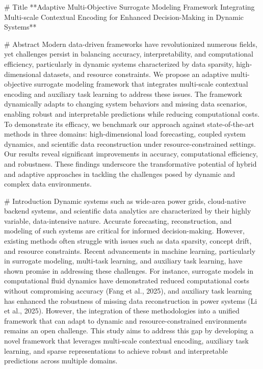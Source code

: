 # Title  
**Adaptive Multi-Objective Surrogate Modeling Framework Integrating Multi-scale Contextual Encoding for Enhanced Decision-Making in Dynamic Systems**

# Abstract  
Modern data-driven frameworks have revolutionized numerous fields, yet challenges persist in balancing accuracy, interpretability, and computational efficiency, particularly in dynamic systems characterized by data sparsity, high-dimensional datasets, and resource constraints. We propose an adaptive multi-objective surrogate modeling framework that integrates multi-scale contextual encoding and auxiliary task learning to address these issues. The framework dynamically adapts to changing system behaviors and missing data scenarios, enabling robust and interpretable predictions while reducing computational costs. To demonstrate its efficacy, we benchmark our approach against state-of-the-art methods in three domains: high-dimensional load forecasting, coupled system dynamics, and scientific data reconstruction under resource-constrained settings. Our results reveal significant improvements in accuracy, computational efficiency, and robustness. These findings underscore the transformative potential of hybrid and adaptive approaches in tackling the challenges posed by dynamic and complex data environments.

# Introduction  
Dynamic systems such as wide-area power grids, cloud-native backend systems, and scientific data analytics are characterized by their highly variable, data-intensive nature. Accurate forecasting, reconstruction, and modeling of such systems are critical for informed decision-making. However, existing methods often struggle with issues such as data sparsity, concept drift, and resource constraints. Recent advancements in machine learning, particularly in surrogate modeling, multi-task learning, and auxiliary task learning, have shown promise in addressing these challenges. For instance, surrogate models in computational fluid dynamics have demonstrated reduced computational costs without compromising accuracy (Fang et al., 2025), and auxiliary task learning has enhanced the robustness of missing data reconstruction in power systems (Li et al., 2025). However, the integration of these methodologies into a unified framework that can adapt to dynamic and resource-constrained environments remains an open challenge. This study aims to address this gap by developing a novel framework that leverages multi-scale contextual encoding, auxiliary task learning, and sparse representations to achieve robust and interpretable predictions across multiple domains.

